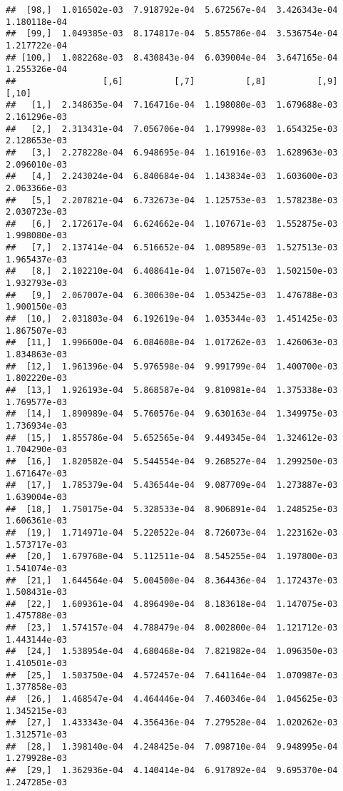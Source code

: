 \documentclass[
]{article}
\begin{document}
\begin{verbatim}
##  [98,]  1.016502e-03  7.918792e-04  5.672567e-04  3.426343e-04  1.180118e-04
##  [99,]  1.049385e-03  8.174817e-04  5.855786e-04  3.536754e-04  1.217722e-04
## [100,]  1.082268e-03  8.430843e-04  6.039004e-04  3.647165e-04  1.255326e-04
##                 [,6]          [,7]          [,8]          [,9]         [,10]
##   [1,]  2.348635e-04  7.164716e-04  1.198080e-03  1.679688e-03  2.161296e-03
##   [2,]  2.313431e-04  7.056706e-04  1.179998e-03  1.654325e-03  2.128653e-03
##   [3,]  2.278228e-04  6.948695e-04  1.161916e-03  1.628963e-03  2.096010e-03
##   [4,]  2.243024e-04  6.840684e-04  1.143834e-03  1.603600e-03  2.063366e-03
##   [5,]  2.207821e-04  6.732673e-04  1.125753e-03  1.578238e-03  2.030723e-03
##   [6,]  2.172617e-04  6.624662e-04  1.107671e-03  1.552875e-03  1.998080e-03
##   [7,]  2.137414e-04  6.516652e-04  1.089589e-03  1.527513e-03  1.965437e-03
##   [8,]  2.102210e-04  6.408641e-04  1.071507e-03  1.502150e-03  1.932793e-03
##   [9,]  2.067007e-04  6.300630e-04  1.053425e-03  1.476788e-03  1.900150e-03
##  [10,]  2.031803e-04  6.192619e-04  1.035344e-03  1.451425e-03  1.867507e-03
##  [11,]  1.996600e-04  6.084608e-04  1.017262e-03  1.426063e-03  1.834863e-03
##  [12,]  1.961396e-04  5.976598e-04  9.991799e-04  1.400700e-03  1.802220e-03
##  [13,]  1.926193e-04  5.868587e-04  9.810981e-04  1.375338e-03  1.769577e-03
##  [14,]  1.890989e-04  5.760576e-04  9.630163e-04  1.349975e-03  1.736934e-03
##  [15,]  1.855786e-04  5.652565e-04  9.449345e-04  1.324612e-03  1.704290e-03
##  [16,]  1.820582e-04  5.544554e-04  9.268527e-04  1.299250e-03  1.671647e-03
##  [17,]  1.785379e-04  5.436544e-04  9.087709e-04  1.273887e-03  1.639004e-03
##  [18,]  1.750175e-04  5.328533e-04  8.906891e-04  1.248525e-03  1.606361e-03
##  [19,]  1.714971e-04  5.220522e-04  8.726073e-04  1.223162e-03  1.573717e-03
##  [20,]  1.679768e-04  5.112511e-04  8.545255e-04  1.197800e-03  1.541074e-03
##  [21,]  1.644564e-04  5.004500e-04  8.364436e-04  1.172437e-03  1.508431e-03
##  [22,]  1.609361e-04  4.896490e-04  8.183618e-04  1.147075e-03  1.475788e-03
##  [23,]  1.574157e-04  4.788479e-04  8.002800e-04  1.121712e-03  1.443144e-03
##  [24,]  1.538954e-04  4.680468e-04  7.821982e-04  1.096350e-03  1.410501e-03
##  [25,]  1.503750e-04  4.572457e-04  7.641164e-04  1.070987e-03  1.377858e-03
##  [26,]  1.468547e-04  4.464446e-04  7.460346e-04  1.045625e-03  1.345215e-03
##  [27,]  1.433343e-04  4.356436e-04  7.279528e-04  1.020262e-03  1.312571e-03
##  [28,]  1.398140e-04  4.248425e-04  7.098710e-04  9.948995e-04  1.279928e-03
##  [29,]  1.362936e-04  4.140414e-04  6.917892e-04  9.695370e-04  1.247285e-03

\end{verbatim}
\end{document}
